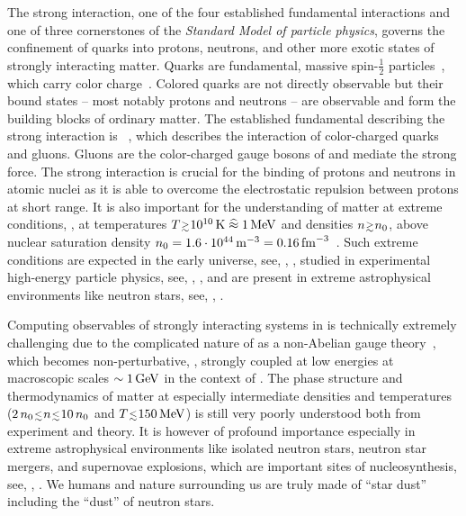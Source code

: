 The strong interaction, one of the four established fundamental interactions and one of three cornerstones of the \textit{Standard Model of particle physics}, governs the confinement of quarks into protons, neutrons, and other more exotic states of strongly interacting matter.
Quarks are fundamental, massive spin-$\frac{1}{2}$ particles~\cite{GellMann:1961ky,Neeman1961Aug,Gell-Mann:1962yej,Zweig:1964ruk,Zweig:1964jf,Bjorken1964Aug,Glashow1970Oct,Kobayashi1973Feb}, which carry color charge~\cite{Greenberg1964Nov,Han1965Aug,Bardeen:1972xk}.
Colored quarks are not directly observable but their bound states \nolinebreak[3]-- most notably protons and neutrons \nolinebreak[3]-- are observable and form the building blocks of ordinary matter.
The established fundamental  describing the strong interaction is ~\cite{Fritzsch1973Nov}, which describes the interaction of color-charged quarks and gluons.
Gluons are the color-charged gauge bosons of \qcd{} and mediate the strong force. 
The strong interaction is crucial for the binding of protons and neutrons in atomic nuclei as it is able to overcome the electrostatic repulsion between protons at short range.
It is also important for the understanding of matter at extreme conditions, \ie{}, at temperatures $T\smallergtrsim 10^{10}\,\mathrm{K}\mathrel{\widehat{\approx}} 1\,\MeV$ and densities $n\smallergtrsim n_0$, above nuclear saturation density $n_0=1.6\cdot10^{44}\,\mathrm{m}^{-3} = 0.16\,\mathrm{fm}^{-3}$~\cite{Horowitz2020Oct}.
Such extreme conditions are expected in the early universe, see, \eg{}, \ccite{\qcdExpLaboratoriesU}, studied in experimental high-energy particle physics, see, \eg{}, , and are present in extreme astrophysical environments like neutron stars, see, \eg{}, \ccite{\qcdExpLaboratoriesNS}.

Computing observables of strongly interacting systems in \qcd{} is technically extremely challenging due to the complicated nature of \qcd{} as a non-Abelian gauge theory~\cite{Yang:1954ek}, which becomes non-perturbative, \ie{}, strongly coupled at low energies \dash{} at macroscopic scales $\sim1\,\mathrm{GeV}$ in the context of \hep{}.
The phase structure and thermodynamics of \qcd{} matter at especially intermediate densities and temperatures ($2\, n_0\smallerlesssim n\smallerlesssim 10\, n_0$ and $T\smallerlesssim 150\,\MeV$) is still very poorly understood both from experiment and theory.
It is however of profound importance especially in extreme astrophysical environments like isolated neutron stars, neutron star mergers, and supernovae explosions, which are important sites of nucleosynthesis, see, \eg{}, .
We humans and nature surrounding us are truly made of ``star dust'' including the ``dust'' of neutron stars.

